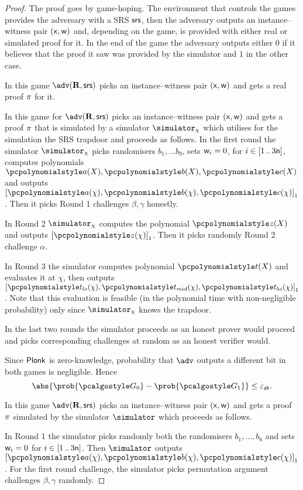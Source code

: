 \documentclass[runningheads,11pt]{llncs}
\begin{document}
\begin{proof}
  The proof goes by game-hoping. The environment that controls the games
  provides the adversary with a SRS $\mathsf{srs}$, then the adversary outputs an
  instance--witness pair $(\mathsf{x}, \mathsf{w})$ and, depending on the game, is provided
  with either real or simulated proof for it. In the end of the game the
  adversary outputs either $0$ if it believes that the proof it saw was provided
  by the simulator and $1$ in the other case.

   In this game $\adv(\REL, \srs)$ picks an instance--witness pair
  $(\mathsf{x}, \mathsf{w})$ and gets a real proof $\pi$ for it.

   In this game for $\adv(\REL, \srs)$ picks an instance--witness pair
  $(\mathsf{x}, \mathsf{w})$ and gets a proof $\pi$ that is simulated by a simulator
  $\simulator_\chi$ which utilises for the simulation the SRS trapdoor and
  proceeds as follows. In the first round the simulator $\simulator_\chi$ picks
  randomisers $b_1, \ldots b_9$, sets $\mathsf{w}_i = 0$, for $i \in [1 \, .. \, 3
    \mathsf{n}]$, computes polynomials $\pa(X), \pb(X), \pc(X)$ and
  outputs $\gone{\pa(\chi), \pb(\chi), \pc(\chi)}$. Then it picks Round 1
  challenges $\beta, \gamma$ honestly.

  In Round 2 $\simulator_\chi$ computes the polynomial $\pz(X)$ and
  outputs $\gone{\pz(\chi)}$. Then it picks randomly Round 2 challenge $\alpha$.

  In Round 3 the simulator computes polynomial $\pt(X)$ and evaluates it
  at $\chi$, then outputs $\gone{\ptlo(\chi), \ptmid(\chi), \pthi(\chi)}$. Note
  that this evaluation is feasible (in the polynomial time with non-negligible
  probability) only since $\simulator_\chi$ knows the trapdoor.

  In the last two rounds the simulator proceeds as an honest prover would
  proceed and picks corresponding challenges at random as an honest verifier
  would.

   Since $\textnormal{\textsf{Plonk}}$ is zero-knowledge,
  probability that $\adv$ outputs a different bit in both games is negligible.
  Hence
  \[
	\abs{\prob{\game{0}} - \prob{\game{1}}} \leq \epszk.
\]

 In this game $\adv(\REL, \srs)$ picks an instance--witness pair
$(\mathsf{x}, \mathsf{w})$ and gets a proof $\pi$ simulated by the simulator
$\simulator$ which proceeds as follows.

In Round 1 the simulator  picks randomly both the randomisers $b_1, \ldots, b_6$ and
sets $\mathsf{w}_i = 0$ for $i \in [1 \, .. \, 3\mathsf{n}]$. Then $\simulator$
outputs $\gone{\p{a}(\chi), \p{b}(\chi), \p{c}(\chi)}$. For the first round
challenge, the simulator picks permutation argument challenges $\beta, \gamma$
randomly.


\end{proof}
\end{document}
